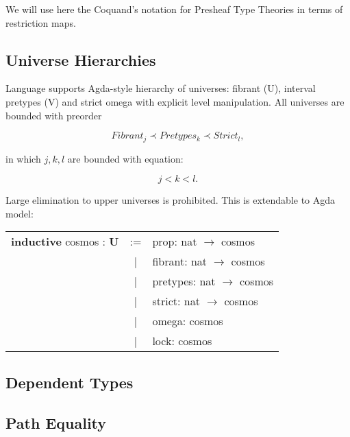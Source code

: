 \documentclass[a4paper,UKenglish,cleveref, autoref, thm-restate]{lipics-v2021}
\begin{document}
We will use here the Coquand's notation for Presheaf Type Theories in terms of restriction maps.

\subsection{Universe Hierarchies}

Language supports Agda-style hierarchy of universes: fibrant (U), interval pretypes (V) and strict omega
with explicit level manipulation. All universes are bounded with preorder

\begin{equation}
Fibrant_j \prec Pretypes_k \prec Strict_l,
\end{equation}

in which $j,k,l$ are bounded with equation:

\begin{equation}
j < k < l.
\end{equation}

Large elimination to upper universes is prohibited. This is extendable to Agda model:

\begin{table}[ht]
\begin{tabular}{rcl}
  \textbf{inductive} cosmos : \textbf{U}& := & prop: nat $\rightarrow$ cosmos \\
   &|& fibrant: nat $\rightarrow$ cosmos \\
   &|& pretypes: nat $\rightarrow$ cosmos \\
   &|& strict: nat $\rightarrow$ cosmos \\
   &|& omega: cosmos \\
   &|& lock: cosmos \\
\end{tabular}
\end{table}

\subsection{Dependent Types}

\subsection{Path Equality}
\end{document}
